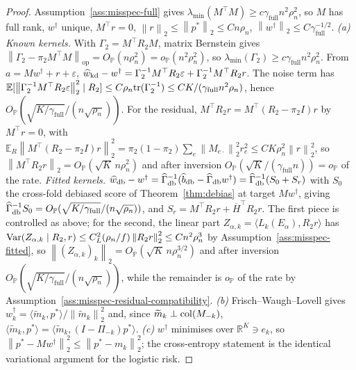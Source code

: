 \documentclass[12pt]{article}
\newcommand{\R}{\mathbb{R}}
\newcommand{\E}{\mathbb{E}}
\newcommand{\1}{\mathbf{1}}
\newcommand{\norm}[1]{\left\lVert#1\right\rVert}
\providecommand{\op}{\operatorname{op}}
\begin{document}
\begin{proof}
Assumption~\ref{ass:misspec-full} gives $\lambda_{\min}(M^\top M)\ge c\gamma_{\mathrm{full}}n^2\rho_n^2$,
so $M$ has full rank, $w^\dagger$ unique, $M^\top r=0$, $\norm{r}_2\le\norm{p^\ast}_2\le Cn\rho_n$,
$\norm{w^\dagger}_2\le C\gamma_{\mathrm{full}}^{-1/2}$. \emph{(a) Known kernels.} With $\Gamma_2=M^\top
R_2M$, matrix Bernstein gives $\norm{\Gamma_2-\pi_2M^\top M}_{\op}=O_{\mathbb P}(n\rho_n^2)=o_{\mathbb
P}(n^2\rho_n^2)$, so $\lambda_{\min}(\Gamma_2)\ge c\gamma_{\mathrm{full}}n^2\rho_n^2$. From
$a=Mw^\dagger+r+\varepsilon$, $\widehat w_{\rm kd}-w^\dagger=\Gamma_2^{-1}M^\top
R_2\varepsilon+\Gamma_2^{-1}M^\top R_2r$. The noise term has $\E[\norm{\Gamma_2^{-1}M^\top
R_2\varepsilon}_2^2\mid R_2]\le C\rho_n{\rm tr}(\Gamma_2^{-1})\le CK/(\gamma_{\mathrm{full}}n^2\rho_n)$,
hence $O_{\mathbb P}(\sqrt{K/\gamma_{\mathrm{full}}}/(n\sqrt{\rho_n}))$. For the residual, $M^\top
R_2r=M^\top(R_2-\pi_2I)r$ by $M^\top r=0$, with $\E_R\norm{M^\top(R_2-\pi_2I)r}_2^2=\pi_2(1-\pi_2)\sum_e\norm{M_{e\cdot}}_2^2r_e^2\le
CK\rho_n^2\norm{r}_2^2$, so $\norm{M^\top R_2r}_2=O_{\mathbb P}(\sqrt K\,n\rho_n^2)$ and after
inversion $O_{\mathbb P}(\sqrt K/(\gamma_{\mathrm{full}}n))=o_{\mathbb P}$ of the rate. \emph{Fitted
kernels.} $\widehat w_{\rm db}-w^\dagger=\widehat\Gamma_{\rm db}^{-1}(\widehat b_{\rm
db}-\widehat\Gamma_{\rm db}w^\dagger)=\widehat\Gamma_{\rm db}^{-1}(S_0+S_r)$ with $S_0$ the
cross-fold debiased score of Theorem~\ref{thm:debias} at target $Mw^\dagger$, giving $\widehat\Gamma_{\rm
db}^{-1}S_0=O_{\mathbb P}(\sqrt{K/\gamma_{\mathrm{full}}}/(n\sqrt{\rho_n}))$, and $S_r=M^\top
R_2r+\overline H^\top R_2r$. The first piece is controlled as above; for the second, the linear part
$Z_{\alpha,k}=\langle L_k(E_\alpha),R_2r\rangle$ has ${\rm Var}(Z_{\alpha,k}\mid
R_2,r)\le C_L^2(\rho_n/f)\norm{R_2r}_2^2\le Cn^2\rho_n^3$ by Assumption~\ref{ass:misspec-fitted}, so
$\norm{(Z_{\alpha,k})_k}_2=O_{\mathbb P}(\sqrt K\,n\rho_n^{3/2})$ and after inversion $O_{\mathbb
P}(\sqrt{K/\gamma_{\mathrm{full}}}/(n\sqrt{\rho_n}))$, while the remainder is $o_{\mathbb P}$ of the rate
by Assumption~\ref{ass:misspec-residual-compatibility}. \emph{(b)} Frisch--Waugh--Lovell gives
$w^\dagger_k=\langle\widetilde m_k,p^\ast\rangle/\norm{\widetilde m_k}_2^2$ and, since $\widetilde
m_k\perp{\rm col}(M_{-k})$, $\langle\widetilde m_k,p^\ast\rangle=\langle\widetilde
m_k,(I-\Pi_{-k})p^\ast\rangle$. \emph{(c)} $w^\dagger$ minimises over $\R^K\ni e_k$, so
$\norm{p^\ast-Mw^\dagger}_2^2\le\norm{p^\ast-m_k}_2^2$; the cross-entropy statement is the identical
variational argument for the logistic risk.
\end{proof}
\end{document}
